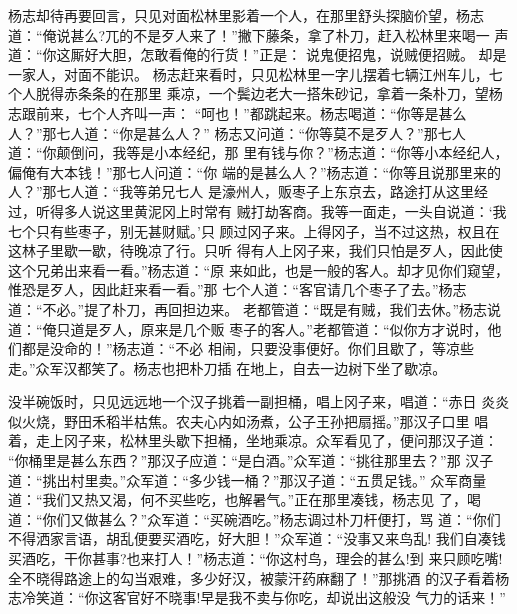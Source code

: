 杨志却待再要回言，只见对面松林里影着一个人，在那里舒头探脑价望，杨志
道：“俺说甚么?兀的不是歹人来了！”撇下藤条，拿了朴刀，赶入松林里来喝一
声道：“你这厮好大胆，怎敢看俺的行货！”正是：
说鬼便招鬼，说贼便招贼。
却是一家人，对面不能识。
杨志赶来看时，只见松林里一字儿摆着七辆江州车儿，七个人脱得赤条条的在那里
乘凉，一个鬓边老大一搭朱砂记，拿着一条朴刀，望杨志跟前来，七个人齐叫一声：
“呵也！”都跳起来。杨志喝道：“你等是甚么人？”那七人道：“你是甚么人？”
杨志又问道：“你等莫不是歹人？”那七人道：“你颠倒问，我等是小本经纪，那
里有钱与你？”杨志道：“你等小本经纪人，偏俺有大本钱！”那七人问道：“你
端的是甚么人？”杨志道：“你等且说那里来的人？”那七人道：“我等弟兄七人
是濠州人，贩枣子上东京去，路途打从这里经过，听得多人说这里黄泥冈上时常有
贼打劫客商。我等一面走，一头自说道：‘我七个只有些枣子，别无甚财赋。’只
顾过冈子来。上得冈子，当不过这热，权且在这林子里歇一歇，待晚凉了行。只听
得有人上冈子来，我们只怕是歹人，因此使这个兄弟出来看一看。”杨志道：“原
来如此，也是一般的客人。却才见你们窥望，惟恐是歹人，因此赶来看一看。”那
七个人道：“客官请几个枣子了去。”杨志道：“不必。”提了朴刀，再回担边来。
老都管道：“既是有贼，我们去休。”杨志说道：“俺只道是歹人，原来是几个贩
枣子的客人。”老都管道：“似你方才说时，他们都是没命的！”杨志道：“不必
相闹，只要没事便好。你们且歇了，等凉些走。”众军汉都笑了。杨志也把朴刀插
在地上，自去一边树下坐了歇凉。

没半碗饭时，只见远远地一个汉子挑着一副担桶，唱上冈子来，唱道：“赤日
炎炎似火烧，野田禾稻半枯焦。农夫心内如汤煮，公子王孙把扇摇。”那汉子口里
唱着，走上冈子来，松林里头歇下担桶，坐地乘凉。众军看见了，便问那汉子道：
“你桶里是甚么东西？”那汉子应道：“是白酒。”众军道：“挑往那里去？”那
汉子道：“挑出村里卖。”众军道：“多少钱一桶？”那汉子道：“五贯足钱。”
众军商量道：“我们又热又渴，何不买些吃，也解暑气。”正在那里凑钱，杨志见
了，喝道：“你们又做甚么？”众军道：“买碗酒吃。”杨志调过朴刀杆便打，骂
道：“你们不得洒家言语，胡乱便要买酒吃，好大胆！”众军道：“没事又来鸟乱!
我们自凑钱买酒吃，干你甚事?也来打人！”杨志道：“你这村鸟，理会的甚么!到
来只顾吃嘴!全不晓得路途上的勾当艰难，多少好汉，被蒙汗药麻翻了！”那挑酒
的汉子看着杨志冷笑道：“你这客官好不晓事!早是我不卖与你吃，却说出这般没
气力的话来！”

